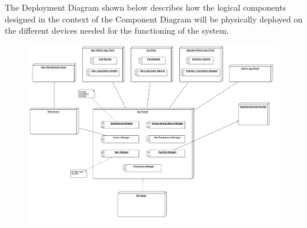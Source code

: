 The Deployment Diagram shown below describes how the logical components designed in the context of the Component Diagram will be physically deployed on the different devices needed for the functioning of the system.

\begin{landscape}
	\begin{figure}[p]
		\includegraphics[height=\vsize, center]{img/deployment_diagrams/global.png}
	\end{figure}
\end{landscape}

